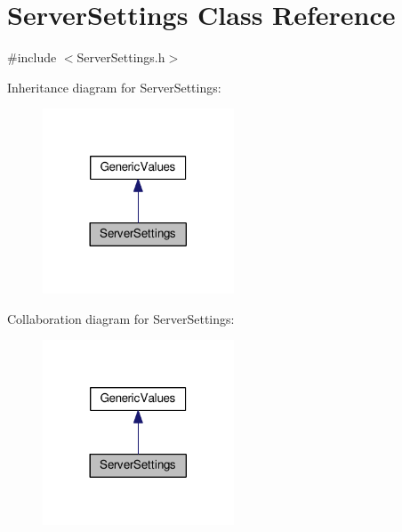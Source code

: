 \hypertarget{classServerSettings}{}\section{Server\+Settings Class Reference}
\label{classServerSettings}


{\ttfamily \#include $<$Server\+Settings.\+h$>$}



Inheritance diagram for Server\+Settings\+:
\nopagebreak
\begin{figure}[H]
\begin{center}
\leavevmode
\includegraphics[width=161pt]{classServerSettings__inherit__graph}
\end{center}
\end{figure}


Collaboration diagram for Server\+Settings\+:
\nopagebreak
\begin{figure}[H]
\begin{center}
\leavevmode
\includegraphics[width=161pt]{classServerSettings__coll__graph}
\end{center}
\end{figure}
